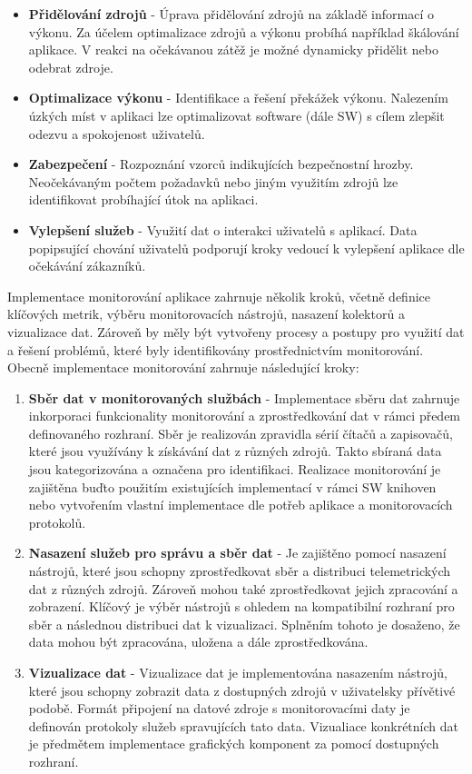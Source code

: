 \begin{itemize}
    \item \textbf{Přidělování zdrojů} - Úprava přidělování zdrojů na základě informací o výkonu. Za účelem optimalizace zdrojů a výkonu probíhá například škálování aplikace. V reakci na očekávanou zátěž je možné dynamicky přidělit nebo odebrat zdroje.
    \item \textbf{Optimalizace výkonu} - Identifikace a řešení překážek výkonu. Nalezením úzkých míst v aplikaci lze optimalizovat software (dále SW) s cílem zlepšit odezvu a spokojenost uživatelů.
    \item \textbf{Zabezpečení} - Rozpoznání vzorců indikujících bezpečnostní hrozby. Neočekávaným počtem požadavků nebo jiným využitím zdrojů lze identifikovat probíhající útok na aplikaci.
    \item \textbf{Vylepšení služeb} - Využití dat o interakci uživatelů s aplikací. Data popipsující chování uživatelů podporují kroky vedoucí k vylepšení aplikace dle očekávání zákazníků.
\end{itemize}


Implementace monitorování aplikace zahrnuje několik kroků, včetně definice klíčových metrik, výběru monitorovacích nástrojů, nasazení kolektorů a vizualizace dat. Zároveň by měly být vytvořeny procesy a postupy pro využití dat a řešení problémů, které byly identifikovány prostřednictvím monitorování. \cite{Blanco2023} Obecně implementace monitorování zahrnuje následující kroky:

\begin{enumerate}
    \item \textbf{Sběr dat v monitorovaných službách} - Implementace sběru dat zahrnuje inkorporaci funkcionality monitorování a zprostředkování dat v rámci předem definovaného rozhraní. Sběr je realizován zpravidla sérií čítačů a zapisovačů, které jsou využívány k získávání dat z různých zdrojů. Takto sbíraná data jsou kategorizována a označena pro identifikaci. Realizace monitorování je zajištěna buďto použitím existujících implementací v rámci SW knihoven nebo vytvořením vlastní implementace dle potřeb aplikace a monitorovacích protokolů.
    \item \textbf{Nasazení služeb pro správu a sběr dat} - Je zajištěno pomocí nasazení nástrojů, které jsou schopny zprostředkovat sběr a distribuci telemetrických dat z různých zdrojů. Zároveň mohou také zprostředkovat jejich zpracování a zobrazení. Klíčový je výběr nástrojů s ohledem na kompatibilní rozhraní pro sběr a následnou distribuci dat k vizualizaci. Splněním tohoto je dosaženo, že data mohou být zpracována, uložena a dále zprostředkována.
    \item \textbf{Vizualizace dat} - Vizualizace dat je implementována nasazením nástrojů, které jsou schopny zobrazit data z dostupných zdrojů v uživatelsky přívětivé podobě. Formát připojení na datové zdroje s monitorovacími daty je definován protokoly služeb spravujících tato data. Vizualiace konkrétních dat je předmětem implementace grafických komponent za pomocí dostupných rozhraní.
\end{enumerate}


